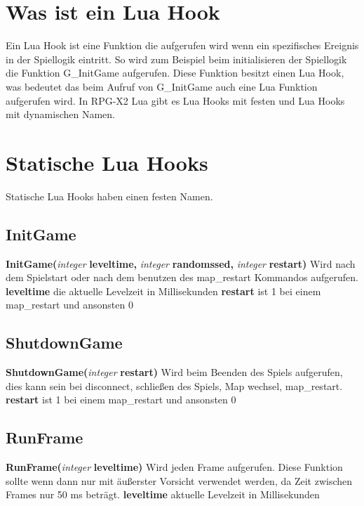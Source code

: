 \documentclass[11pt,a4paper]{book}
\begin{document}
\section{Was ist ein Lua Hook}
\label{wia-lh}
Ein Lua Hook ist eine Funktion die aufgerufen wird wenn ein spezifisches Ereignis in der Spiellogik eintritt. So wird zum Beispiel beim initialisieren der Spiellogik die Funktion G\_InitGame aufgerufen. Diese Funktion besitzt einen Lua Hook, was bedeutet das beim Aufruf von G\_InitGame auch eine Lua Funktion aufgerufen wird. In RPG-X2 Lua gibt es Lua Hooks mit festen und Lua Hooks mit dynamischen Namen.
\section{Statische Lua Hooks}
\label{s-lh}
Statische Lua Hooks haben einen festen Namen.
\subsection{InitGame}
\label{init-game}
\textbf{InitGame(}\textit{integer} \textbf{leveltime,} \textit{integer} \textbf{randomssed, }\textit{integer} \textbf{restart)}
\newline
Wird nach dem Spielstart oder nach dem benutzen des map\_restart Kommandos aufgerufen.
\newline
\textbf{leveltime} die aktuelle Levelzeit in Millisekunden
\newline
\textbf{restart} ist 1 bei einem map\_restart und ansonsten 0
\subsection{ShutdownGame}
\label{shutdown-game}
\textbf{ShutdownGame(}\textit{integer} \textbf{restart)}
\newline
Wird beim Beenden des Spiels aufgerufen, dies kann sein bei disconnect, schließen des Spiels, Map wechsel, map\_restart.
\newline
\textbf{restart} ist 1 bei einem map\_restart und ansonsten 0
\subsection{RunFrame}
\label{run-frame}
\textbf{RunFrame(}\textit{integer} \textbf{leveltime)}
\newline
Wird jeden Frame aufgerufen. Diese Funktion sollte wenn dann nur mit äußerster Vorsicht verwendet werden, da Zeit zwischen Frames nur 50 ms beträgt.
\newline
\textbf{leveltime} aktuelle Levelzeit in Millisekunden
\end{document}
